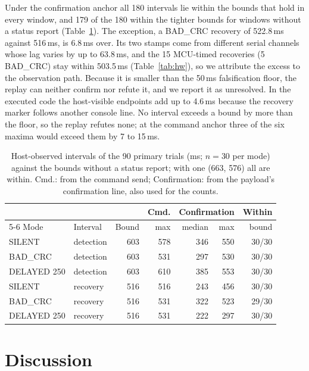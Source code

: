 \documentclass[conference,a4paper]{IEEEtran}
\begin{document}
Under the confirmation anchor all 180 intervals lie within the bounds that hold in every window, and 179 of the 180 within the tighter bounds for windows without a status report (Table~\ref{tab:desc}). The exception, a BAD\_CRC recovery of 522.8\,ms against 516\,ms, is 6.8\,ms over. Its two stamps come from different serial channels whose lag varies by up to 63.8\,ms, and the 15 MCU-timed recoveries (5 BAD\_CRC) stay within 503.5\,ms (Table~\ref{tab:hw}), so we attribute the excess to the observation path. Because it is smaller than the 50\,ms falsification floor, the replay can neither confirm nor refute it, and we report it as unresolved. In the executed code the host-visible endpoints add up to 4.6\,ms because the recovery marker follows another console line. No interval exceeds a bound by more than the floor, so the replay refutes none; at the command anchor three of the six maxima would exceed them by 7 to 15\,ms.

\begin{table}[t]
\centering\footnotesize
\caption{Host-observed intervals of the 90 primary trials (ms; $n=30$ per mode) against the bounds without a status report; with one (663, 576) all are within. Cmd.: from the command send; Confirmation: from the payload's confirmation line, also used for the counts.}
\label{tab:desc}
\setlength{\tabcolsep}{3.5pt}
\begin{tabular}{@{}llrrrrr@{}}
\toprule
& & & Cmd. & \multicolumn{2}{c}{Confirmation} & Within \\
\cmidrule(lr){5-6}
Mode & Interval & Bound & max & median & max & bound \\
\midrule
SILENT      & detection & 603 & 578 & 346 & 550 & 30/30 \\
BAD\_CRC    & detection & 603 & 531 & 297 & 530 & 30/30 \\
DELAYED 250 & detection & 603 & 610 & 385 & 553 & 30/30 \\
SILENT      & recovery  & 516 & 516 & 243 & 456 & 30/30 \\
BAD\_CRC    & recovery  & 516 & 531 & 322 & 523 & 29/30 \\
DELAYED 250 & recovery  & 516 & 531 & 222 & 297 & 30/30 \\
\bottomrule
\end{tabular}
\end{table}

\section{Discussion}
\label{sec:discussion}
\end{document}
